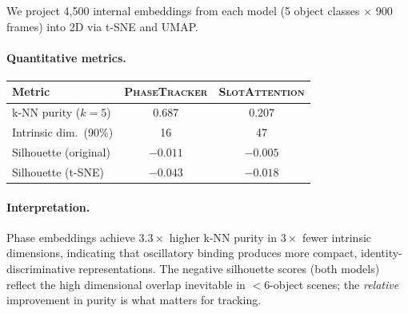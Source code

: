 \documentclass[11pt]{article}
\providecommand{\pt}{\textnormal{\textsc{PhaseTracker}}\xspace}
\providecommand{\sa}{\textnormal{\textsc{SlotAttention}}\xspace}
\begin{document}
We project 4{,}500 internal embeddings from each model
(5 object classes $\times$ 900 frames) into 2D via t-SNE and UMAP.

\paragraph{Quantitative metrics.}

\begin{center}
\begin{tabular}{lcc}
\toprule
Metric & \pt & \sa \\
\midrule
k-NN purity ($k=5$) & 0.687 & 0.207 \\
Intrinsic dim.\ (90\%) & 16 & 47 \\
Silhouette (original) & $-0.011$ & $-0.005$ \\
Silhouette (t-SNE) & $-0.043$ & $-0.018$ \\
\bottomrule
\end{tabular}
\end{center}

\paragraph{Interpretation.}
Phase embeddings achieve $3.3\times$ higher k-NN purity in
$3\times$ fewer intrinsic dimensions, indicating that oscillatory
binding produces more compact, identity-discriminative representations.
The negative silhouette scores (both models) reflect the high
dimensional overlap inevitable in $<$6-object scenes; the \emph{relative}
improvement in purity is what matters for tracking.


\end{document}
